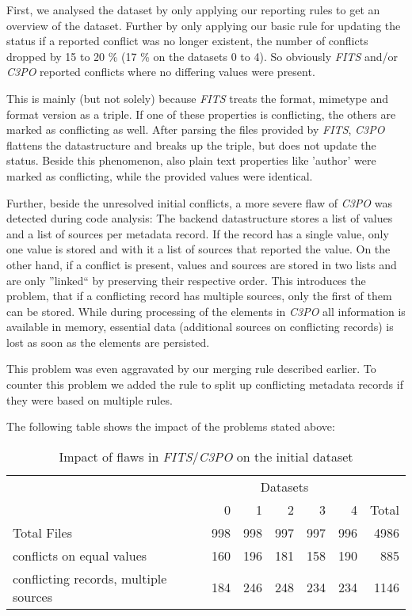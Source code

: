 \documentclass[a4paper,12pt]{article}
\begin{document}
First, we analysed the dataset by only applying our reporting rules to get an overview of the dataset. Further by only applying our basic rule for updating the status if a reported conflict was no longer existent, the number of conflicts dropped by 15 to 20 \% (17 \% on the datasets 0 to 4). So obviously \emph{FITS} and/or \emph{C3PO} reported conflicts where no differing values were present. 

This is mainly (but not solely) because \emph{FITS} treats the format, mimetype and format version as a triple. If one of these properties is conflicting, the others are marked as conflicting as well. After parsing the files provided by \emph{FITS}, \emph{C3PO} flattens the datastructure and breaks up the triple, but does not update the status. Beside this phenomenon, also plain text properties like 'author' were marked as conflicting, while the provided values were identical.

Further, beside the unresolved initial conflicts, a more severe flaw of \emph{C3PO} was detected during code analysis: The backend datastructure stores a list of values and a list of sources per metadata record. If the record has a single value, only one value is stored and with it a list of sources that reported the value. On the other hand, if a conflict is present, values and sources are stored in two lists and are only ''linked`` by preserving their respective order. This introduces the problem, that if a conflicting record has multiple sources, only the first of them can be stored. While during processing of the elements in \emph{C3PO} all information is available in memory, essential data (additional sources on conflicting records) is lost as soon as the elements are persisted.

This problem was even aggravated by our merging rule described earlier. To counter this problem we added the rule to split up conflicting metadata records if they were based on multiple rules.

The following table shows the impact of the problems stated above:

\begin{table}[ht]
\begin{center}

\begin{tabular}[h]{l||r|r|r|r|r||r}
 &  \multicolumn{5}{c}{Datasets} \\
        & 0 & 1 & 2 & 3 & 4 & Total \\
\hline
Total Files & 998 & 998 & 997 & 997 & 996 & 4986\\ 
\hline
conflicts on equal values & 160 & 196 & 181 & 158 & 190 & 885 \\
conflicting records, multiple sources & 184 & 246 & 248 & 234 & 234 & 1146\\

\end{tabular}
\end{center}
\caption{Impact of flaws in \emph{FITS}/\emph{C3PO} on the initial dataset }
\label{tab:files}
\end{table}
\end{document}
